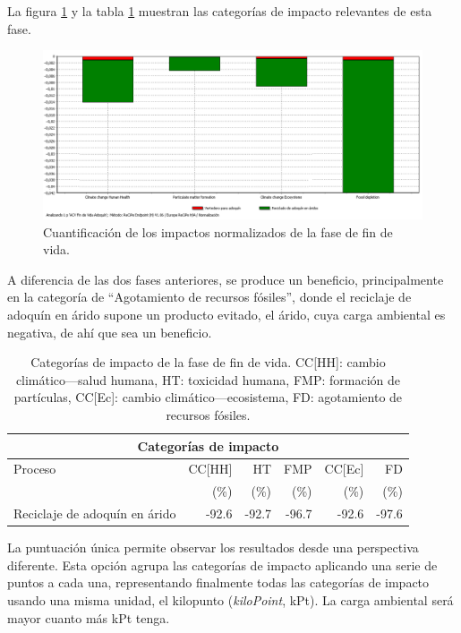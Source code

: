 La figura \ref{fig:fdv_normalizacion} y la tabla \ref{categoriasimpactofdv} muestran las categorías de impacto relevantes de esta fase.

\begin{figure}[!htb]
\centering
\includegraphics[width=15cm]{img/fdv_normalizacion.png}
\caption{Cuantificación de los impactos normalizados de la fase de fin de vida.}
\label{fig:fdv_normalizacion}
\end{figure}

A diferencia de las dos fases anteriores, se produce un beneficio, principalmente en la categoría de ``Agotamiento de recursos fósiles'', donde el reciclaje de adoquín en árido supone un producto evitado, el árido, cuya carga ambiental es negativa, de ahí que sea un beneficio.

\begin{table}[!htb]
\centering
\begin{tabular}{p{4cm}rrrrr}
\toprule
\multicolumn{6}{c}{Categorías de impacto}\\
\midrule
Proceso & CC[HH] & HT & FMP & CC[Ec] & FD\\
 & (\%) & (\%) & (\%) & (\%) & (\%)\\
\midrule
Reciclaje de adoquín en árido & -92.6 & -92.7 & -96.7 & -92.6 & -97.6\\
\bottomrule
\end{tabular}
\caption[Categorías de impacto de la fase de fin de vida.]{Categorías de impacto de la fase de fin de vida. CC[HH]: cambio climático—salud humana, HT: toxicidad humana, FMP: formación de partículas, CC[Ec]: cambio climático—ecosistema, FD: agotamiento de recursos fósiles.}
\label{categoriasimpactofdv}
\end{table}

La puntuación única permite observar los resultados desde una perspectiva diferente. Esta opción agrupa las categorías de impacto aplicando una serie de puntos a cada una, representando finalmente todas las categorías de impacto usando una misma unidad, el kilopunto (\textit{kiloPoint}, kPt). La carga ambiental será mayor cuanto más kPt tenga.

